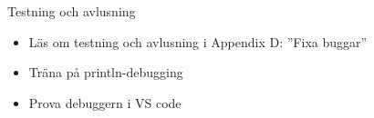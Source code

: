 
\begin{Slide}{Testning och avlusning}
\begin{itemize}
\item Läs om testning och avlusning  i Appendix D: ''Fixa buggar'' 
\item Träna på println-debugging
\item Prova debuggern i VS code
\end{itemize}
\end{Slide}








